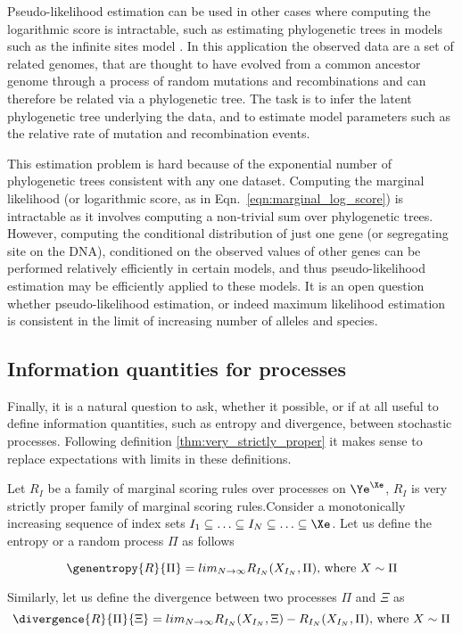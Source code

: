 Pseudo-likelihood estimation can be used in other cases where computing the logarithmic score is intractable, such as estimating phylogenetic trees in models such as the infinite sites model \citep{something, something} . In this application the observed data are a set of related genomes, that are thought to have evolved from a common ancestor genome through a process of random mutations and recombinations and can therefore be related via a phylogenetic tree. The task is to infer the latent phylogenetic tree underlying the data, and to estimate model parameters such as the relative rate of mutation and recombination events.

This estimation problem is hard because of the exponential number of phylogenetic trees consistent with any one dataset. Computing the marginal likelihood (or logarithmic score, as in Eqn.\ \eqref{eqn:marginal_log_score}) is intractable as it involves computing a non-trivial sum over phylogenetic trees. However, computing the conditional distribution of just one gene (or segregating site on the DNA), conditioned on the observed values of other genes can be performed relatively efficiently in certain models, and thus pseudo-likelihood estimation may be efficiently applied to these models. It is an open question whether pseudo-likelihood estimation, or indeed maximum likelihood estimation is consistent in the limit of increasing number of alleles and species.

\subsection{Information quantities for processes}

Finally, it is a natural question to ask, whether it possible, or if at all useful to define information quantities, such as entropy and divergence, between stochastic processes. Following definition \ref{thm:very_strictly_proper} it makes sense to replace expectations with limits in these definitions.

\begin{definition}\label{thm:process_entropy_divergence}
Let $R_{I}$ be a family of marginal scoring rules over processes on $\Ye^{\Xe}$, $R_{I}$ is very strictly proper family of marginal scoring rules.Consider a monotonically increasing sequence of index sets $I_1\subseteq\ldots\subseteq I_N \subseteq \ldots \subseteq \Xe$. Let us define the entropy or a random process $\Pi$ as follows

\begin{equation}
	\genentropy{R}{\Pi} = lim_{N\rightarrow\infty}R_{I_N}(X_{I_N},\Pi) \mbox{, where } X \sim \Pi
\end{equation}

Similarly, let us define the divergence between two processes $\Pi$ and $\Xi$ as
\begin{equation}
	\divergence{R}{\Pi}{\Xi} =  lim_{N\rightarrow\infty}R_{I_N}(X_{I_N},\Xi) - R_{I_N}(X_{I_N},\Pi) \mbox{, where } X \sim \Pi
\end{equation}
\end{definition}

